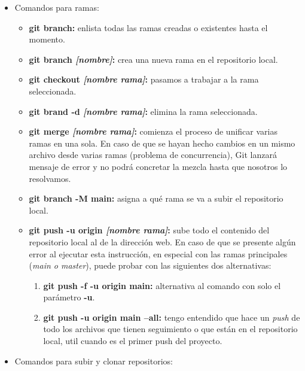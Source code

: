 \begin{itemize}
\begin{itemize}
        \begin{itemize}
            \item \textbf{git config –global user.name “\textit{nombre usuario GitHub}”}
            \item \textbf{git config –global user.email “\textit{correo electrónico GitHub}”}
        \end{itemize}
    \end{itemize}
    \item Comandos para ramas:
    \begin{itemize}
        \item \textbf{git branch:} enlista todas las ramas creadas o existentes hasta el momento.
        \item \textbf{git branch \textit{[nombre]}:} crea una nueva rama en el repositorio local.
        \item \textbf{git checkout \textit{[nombre rama]}:} pasamos a trabajar a la rama seleccionada.
        \item \textbf{git brand -d \textit{[nombre rama]}:} elimina la rama seleccionada.
        \item \textbf{git merge \textit{[nombre rama]}:} comienza el proceso de unificar varias ramas en una sola. En caso de que se hayan hecho cambios en un mismo archivo desde varias ramas (problema de concurrencia), Git lanzará mensaje de error y no podrá concretar la mezcla hasta que nosotros lo resolvamos.
        \item \textbf{git branch -M main: }asigna a qué rama se va a subir el repositorio local.
        \item \textbf{git push -u origin \textit{[nombre rama]}:} sube todo el contenido del repositorio local al de la dirección web. En caso de que se presente algún error al ejecutar esta instrucción, en especial con las ramas principales (\textit{main o master}), puede probar con las siguientes dos alternativas:
        \begin{enumerate}
        		\item \textbf{git push -f -u origin main:} alternativa al comando con solo el parámetro \textbf{-u}.
        		\item \textbf{git push -u origin main --all:} tengo entendido que hace un \textit{push} de todo los archivos que tienen seguimiento o que están en el repositorio local, util cuando es el primer push del proyecto.
        \end{enumerate}
    \end{itemize}
    \item Comandos para subir y clonar repositorios:

\end{itemize}
